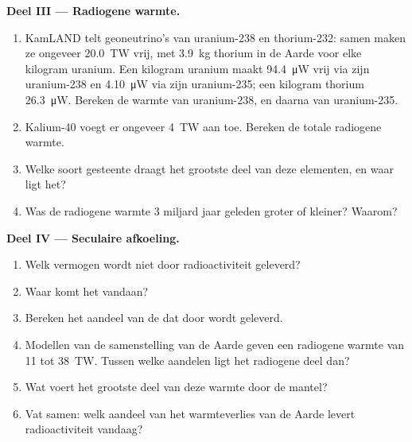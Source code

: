 \begin{problem}
\medskip
\noindent\textbf{Deel III --- Radiogene warmte.}
\begin{enumerate}[resume]
  \item KamLAND telt geoneutrino's van uranium-238 en thorium-232: samen
        maken ze ongeveer \qty{20.0}{TW} vrij, met \qty{3.9}{kg} thorium in
        de Aarde voor elke kilogram uranium. Een kilogram uranium maakt
        \qty{94.4}{\micro W} vrij via zijn uranium-238 en \qty{4.10}{\micro W}
        via zijn uranium-235; een kilogram thorium \qty{26.3}{\micro W}.
        Bereken de warmte van uranium-238, en daarna van uranium-235.
  \item Kalium-40 voegt er ongeveer \qty{4}{TW} aan toe. Bereken de totale radiogene warmte.
  \item Welke soort gesteente draagt het grootste deel van deze elementen, en waar ligt het?
  \item Was de radiogene warmte 3 miljard jaar geleden groter of kleiner? Waarom?
\end{enumerate}

\medskip
\noindent\textbf{Deel IV --- Seculaire afkoeling.}
\begin{enumerate}[resume]
  \item Welk vermogen wordt niet door radioactiviteit geleverd?
  \item Waar komt het vandaan?
  \item Bereken het aandeel van de  dat door  wordt geleverd.
  \item Modellen van de samenstelling van de Aarde geven een radiogene warmte van 11 tot
        \qty{38}{TW}.
        Tussen welke aandelen ligt het radiogene deel dan?
  \item Wat voert het grootste deel van deze warmte door de mantel?
  \item Vat samen: welk aandeel van het warmteverlies van de Aarde levert radioactiviteit
        vandaag?
\end{enumerate}
\end{problem}
